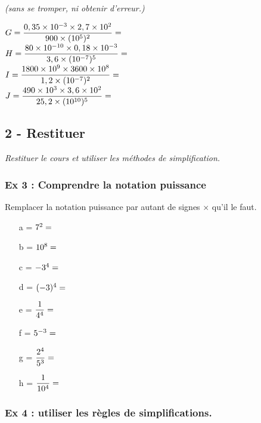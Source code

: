 \documentclass[12pt]{article}
\begin{document}
\textit{(sans se tromper, ni obtenir d'erreur.)}

\begin{multicols}{2}

  $G = \dfrac{0,35 \times 10^{-3} \times 2,7 \times 10^{2}}{900 \times (10^5)^2} =  \dotfill $\\
  $H = \dfrac{80 \times 10^{-10} \times 0,18 \times 10^{-3}}{3,6 \times (10^{-7})^5} =  \dotfill $ \\
  $I = \dfrac{1800 \times 10^{9} \times 3600 \times 10^{8}}{1,2 \times (10^{-7})^2} =  \dotfill $\\
  $J = \dfrac{490 \times 10^{3} \times 3,6 \times 10^{2}}{25,2 \times (10^{10})^5} =  \dotfill $ 

\end{multicols}

\subsection*{2 - Restituer}

\textit{Restituer le cours et utiliser les méthodes de simplification.}

\subsubsection*{Ex 3 : Comprendre la notation puissance}

Remplacer la notation puissance par autant de signes $\times$ qu'il le faut. 

\begin{multicols}{3}
  \begin{itemize}
  \item[a =] $7^2 =  \dotfill $
  \item[b =] $10^{8} =  \dotfill $
  \item[c =] $-3^4  =  \dotfill $
  \item[d =] $(-3)^{4} =  \dotfill $
  \item[e =] $\dfrac{1}{4^4} =  \dotfill $
  \item[f =] $ 5^{-3} =  \dotfill $
  \item[g =] $ \dfrac{2^4}{5^{3}} =  \dotfill $
  \item[h =] $ \dfrac{1}{10^{4}} =  \dotfill $
  \end{itemize}
\end{multicols}

\subsubsection*{Ex 4 : utiliser les règles de simplifications.}
\end{document}

